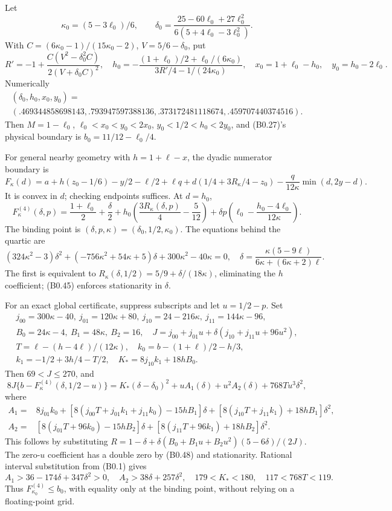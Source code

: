 \documentclass[11pt,a4paper]{article}
\begin{document}
Let \[
\kappa_0=(5-3\ell_0)/6,\qquad
\delta_0=\frac{25-60\ell_0+27\ell_0^2}{6(5+4\ell_0-3\ell_0^2)}.
\] With \(C=(6\kappa_0-1)/(15\kappa_0-2)\), \(V=5/6-\delta_0\), put \[
R'=-1+\frac{C(V^2-\delta_0^2C)}{2(V+\delta_0C)^2},\quad
h_0=-\frac{(1+\ell_0)/2+\ell_0/(6\kappa_0)}{3R'/4-1/(24\kappa_0)},
\quad x_0=1+\ell_0-h_0,\quad y_0=h_0-2\ell_0.
\tag{B0.45}
\] Numerically
\[
\begin{gathered}
(\delta_0,h_0,x_0,y_0)=\\
(.469344858698143,.793947597388136,.373172481118674,.459707440374516).
\end{gathered}
\]
Then \(M=1-\ell_0\), \(\ell_0<x_0<y_0<2x_0\), \(y_0<1/2<h_0<2y_0\), and
(B0.27)'s physical boundary is \(b_0=11/12-\ell_0/4\).

For general nearby geometry with \(h=1+\ell-x\), the dyadic numerator
boundary is \[
F_\kappa(d)=a+h(z_0-1/6)-y/2-\ell/2+\ell q
+d(1/4+3R_\kappa/4-z_0)-\frac q{12\kappa}\min(d,2y-d).
\tag{B0.46}
\] It is convex in \(d\); checking endpoints suffices. At \(d=h_0\), \[
F^{(4)}_\kappa(\delta,p)=\frac{1+\ell_0}{2}+\frac\delta2
+h_0\left(\frac{3R_\kappa(\delta,p)}4-\frac5{12}\right)
+\delta p\left(\ell_0-\frac{h_0-4\ell_0}{12\kappa}\right).
\tag{B0.47}
\] The binding point is \((\delta,\allowbreak{}p,\allowbreak{}\kappa)=(\delta_0,\allowbreak{}1/2,\allowbreak{}\kappa_0)\).
The equations behind the quartic are \[
(324\kappa^2-3)\delta^2+(-756\kappa^2+54\kappa+5)\delta+300\kappa^2-40\kappa=0,
\quad \delta=\frac{\kappa(5-9\ell)}{6\kappa+(6\kappa+2)\ell}.
\tag{B0.48}
\] The first is equivalent to
\(R_\kappa(\delta,\allowbreak{}1/2)=5/9+\delta/(18\kappa)\), eliminating the \(h\)
coefficient; (B0.45) enforces stationarity in \(\delta\).

For an exact global certificate, suppress subscripts and let
\(u=1/2-p\). Set \[
\begin{gathered}
j_{00}=300\kappa-40,\ j_{01}=120\kappa+80,\ j_{10}=24-216\kappa,\ j_{11}=144\kappa-96,\\
B_0=24\kappa-4,\ B_1=48\kappa,\ B_2=16,\quad
J=j_{00}+j_{01}u+\delta(j_{10}+j_{11}u+96u^2),\\
T=\ell-(h-4\ell)/(12\kappa),\quad
k_0=b-(1+\ell)/2-h/3,\\ k_1=-1/2+3h/4-T/2,\quad
K_*=8j_{10}k_1+18hB_0.
\end{gathered}
\] Then \(69<J\le270\), and \[
8J\{b-F^{(4)}_\kappa(\delta,1/2-u)\}
=K_*(\delta-\delta_0)^2+uA_1(\delta)+u^2A_2(\delta)+768Tu^3\delta^2,
\tag{B0.49}
\] where \[
\begin{aligned}
A_1={}&8j_{01}k_0+[8(j_{00}T+j_{01}k_1+j_{11}k_0)-15hB_1]\delta
+[8(j_{10}T+j_{11}k_1)+18hB_1]\delta^2,\\
A_2={}&[8(j_{01}T+96k_0)-15hB_2]\delta
+[8(j_{11}T+96k_1)+18hB_2]\delta^2.
\end{aligned}
\] This follows by substituting
\(R=1-\delta+\delta(B_0+B_1u+B_2u^2)(5-6\delta)/(2J)\). The zero-\(u\)
coefficient has a double zero by (B0.48) and stationarity. Rational
interval substitution from (B0.1) gives \[
A_1>36-174\delta+347\delta^2>0,\quad
A_2>38\delta+257\delta^2,\quad179<K_*<180,\quad117<768T<119.
\] Thus \(F^{(4)}_{\kappa_0}\le b_0\), with equality only at the binding
point, without relying on a floating-point grid.
\end{document}
